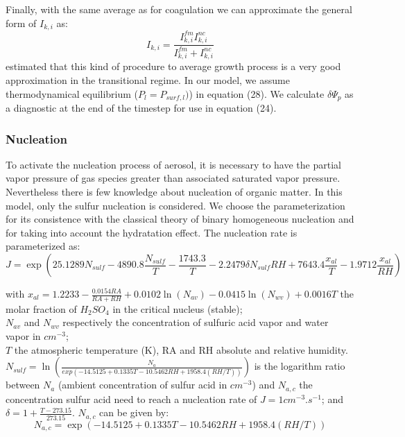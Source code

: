 Finally, with the same average as for coagulation we can approximate the general
form of $I_{k,i}$ as:
\begin{equation}
I_{k,i} = \frac{I^{fm}_{k,i} I^{nc}_{k,i}}{I^{fm}_{k,i} + I^{nc}_{k,i}}
\label{ik_fin}
\end{equation}
\citet{Pratsini1988} estimated that this kind of procedure to average 
growth process is a very good approximation in the transitional regime.
In our model, we assume thermodynamical equilibrium ($P_l = P_{surf,l}) $) in equation (28).
We calculate $\delta \Psi_p$ as a diagnostic at the end of the timestep for use in equation (24).

\subsubsection*{Nucleation}

To activate the nucleation process of aerosol, it is necessary to 
have
the partial vapor pressure of gas species greater than associated saturated 
vapor pressure.
Nevertheless  there is few knowledge about nucleation of organic matter. In this 
model, only the sulfur nucleation is considered. We choose the \citet{Kulmala1998} 
parameterization for its consistence with the classical theory of binary 
homogeneous
nucleation \citep{Wilemski1984} and for taking into account the hydratation 
effect.
The nucleation rate is parameterized as: 
\begin{equation}
J = \exp \left( 25.1289 N_{sulf} - 4890.8 \frac{N_{sulf}}{T} -\frac{1743.3}{T} 
-2.2479 \delta N_{sulf} RH + 7643.4 \frac{x_{al}}{T} - 1.9712 \frac{x_{al}}{RH} 
\right)
\label{nucleation}
\end{equation}

with  
$x_{al}=1.2233 - \frac{0.0154 RA}{RA+RH} + 0.0102 \ln(N_{av})-0.0415\ln(N_{wv}) 
+ 0.0016 T$ the molar fraction of $H_2SO_4$ in the critical nucleus (stable);\\
$N_{av}$ and $N_{wv}$ respectively the concentration  of sulfuric acid vapor and water vapor in 
$cm^{-3}$; \\
$T$ the atmospheric temperature (K), RA and RH absolute and relative humidity. 
$N_{sulf} = \ln\left(\frac{N_a}{exp(-14.5125+0.1335T-10.5462 RH+1958.4(RH/T))} 
\right)$ 
is the logarithm ratio between $N_a$ (ambient concentration of sulfur acid in 
$cm^{-3}$) and $N_{a,c}$ the concentration sulfur acid need to reach a nucleation 
rate of $J= 1 cm^{-3}.s^{-1}$; 
and $\delta = 1 + \frac{T - 273.15}{273.15}$.
$N_{a,c}$ can be given by:
\begin{equation}
N_{a,c} = \exp (-14.5125 + 0.1335 T - 10.5462 RH + 1958.4 (RH/T)) 
\label{nac}
\end{equation}

